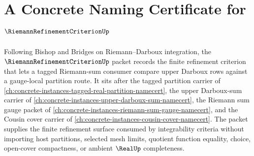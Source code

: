 \chapter{A Concrete Naming Certificate for $\RiemannRefinementCriterionUp$}
\label{ch:concrete-instances-riemann-refinement-criterion-namecert}

Following Bishop and Bridges on Riemann--Darboux integration, the $\RiemannRefinementCriterionUp$ packet records the finite refinement criterion that lets a tagged Riemann-sum consumer compare upper Darboux rows against a gauge-local partition route. It sits after the tagged partition carrier of \autoref{ch:concrete-instances-tagged-real-partition-namecert}, the upper Darboux-sum carrier of \autoref{ch:concrete-instances-upper-darboux-sum-namecert}, the Riemann sum gauge packet of \autoref{ch:concrete-instances-riemann-sum-gauge-namecert}, and the Cousin cover carrier of \autoref{ch:concrete-instances-cousin-cover-namecert}. The packet supplies the finite refinement surface consumed by integrability criteria without importing host partitions, selected mesh limits, quotient function equality, choice, open-cover compactness, or ambient $\RealUp$ completeness.


